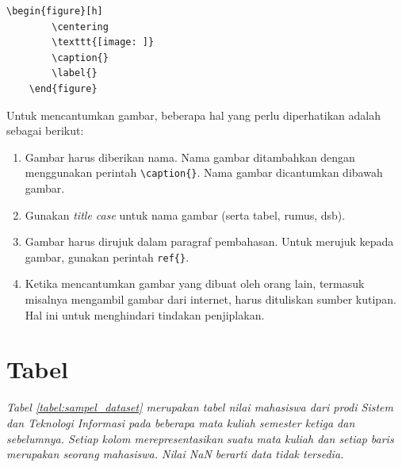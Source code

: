\begin{lstlisting}[caption={Kode Latex untuk mencantumkan gambar}, float]
    \begin{figure}[h]
        \centering
      	\texttt{[image: ]}
      	\caption{}
      	\label{}
    \end{figure}
\end{lstlisting}

Untuk mencantumkan gambar, beberapa hal yang perlu diperhatikan adalah sebagai berikut:

\begin{enumerate}
    \item Gambar harus diberikan nama. Nama gambar ditambahkan dengan menggunakan perintah \verb|\caption{}|. Nama gambar dicantumkan dibawah gambar.
    \item Gunakan \textit{title case} untuk nama gambar (serta tabel, rumus, dsb).
    \item Gambar harus dirujuk dalam paragraf pembahasan. Untuk merujuk kepada gambar, gunakan perintah \verb|ref{}|. 
    \item Ketika mencantumkan gambar yang dibuat oleh orang lain, termasuk misalnya mengambil gambar dari internet, harus dituliskan sumber kutipan. Hal ini untuk menghindari tindakan penjiplakan. 
\end{enumerate}

\section{Tabel}

\textit{Tabel \ref{tabel:sampel_dataset} merupakan tabel nilai mahasiswa dari prodi Sistem dan Teknologi Informasi pada beberapa mata kuliah semester ketiga dan sebelumnya. Setiap kolom merepresentasikan suatu mata kuliah dan setiap baris merupakan seorang mahasiswa. Nilai NaN berarti data tidak tersedia.}


